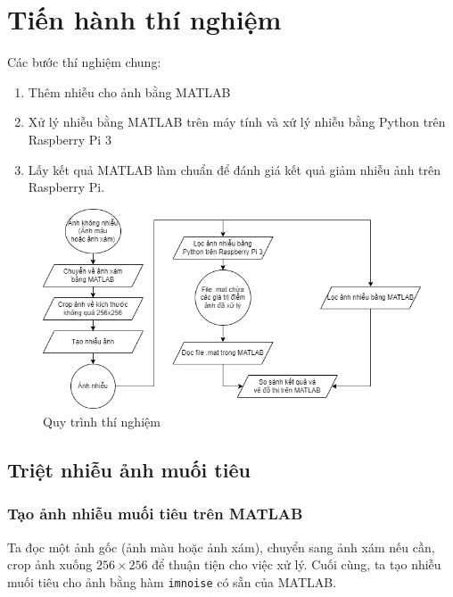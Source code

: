 \section{Tiến hành thí nghiệm}

Các bước thí nghiệm chung:

\begin{enumerate}
    \item Thêm nhiễu cho ảnh bằng MATLAB
    \item Xử lý nhiễu bằng MATLAB trên máy tính và xứ lý nhiễu bằng Python trên Raspberry Pi 3
    \item Lấy kết quả MATLAB làm chuẩn để đánh giá kết quả giảm nhiễu ảnh trên Raspberry Pi.
\end{enumerate}

\begin{figure}[H]
    \centering
    \includegraphics[width=\linewidth]{images/denoise_flowchart.png}
    \caption{Quy trình thí nghiệm}
\end{figure}

\subsection{Triệt nhiễu ảnh muối tiêu}

\subsubsection{Tạo ảnh nhiễu muối tiêu trên MATLAB}

Ta đọc một ảnh gốc (ảnh màu hoặc ảnh xám), chuyển sang ảnh xám nếu cần, crop ảnh xuống $256 \times 256$ để thuận tiện cho việc xử lý. Cuối cùng, ta tạo nhiễu muối tiêu cho ảnh bằng hàm \texttt{imnoise} có sẵn của MATLAB.

